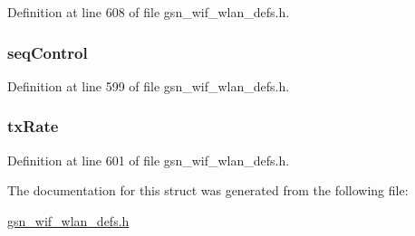 Definition at line 608 of file gsn\_\-wif\_\-wlan\_\-defs.h.

\hypertarget{a00314_aaa8b67573a2ca92fa28a335243b69a86}{
\subsubsection[{seqControl}]{ {\bf seqControl}}}
\label{a00314_aaa8b67573a2ca92fa28a335243b69a86}


Definition at line 599 of file gsn\_\-wif\_\-wlan\_\-defs.h.

\hypertarget{a00314_ab1ab70812caf37881581c451398a6f9c}{
\subsubsection[{txRate}]{ {\bf txRate}}}
\label{a00314_ab1ab70812caf37881581c451398a6f9c}


Definition at line 601 of file gsn\_\-wif\_\-wlan\_\-defs.h.



The documentation for this struct was generated from the following file:\begin{DoxyCompactItemize}
\item 
\hyperlink{a00613}{gsn\_\-wif\_\-wlan\_\-defs.h}\end{DoxyCompactItemize}
